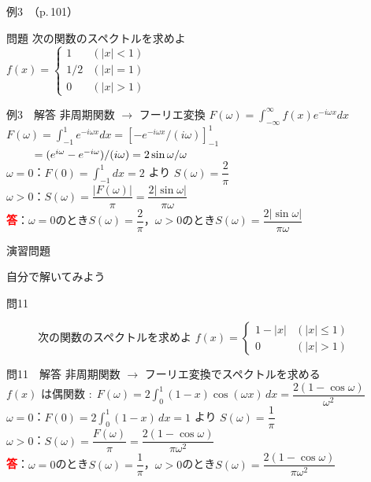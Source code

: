 \documentclass[professionalfonts]{beamer}
\begin{document}
\begin{frame}{例3　（p.\,101）}
  \begin{exampleblock}{問題}
    次の関数のスペクトルを求めよ\\[2pt]
    $f(x) = \begin{cases} 1 & (|x| < 1) \\ 1/2 & (|x| = 1) \\ 0 & (|x| > 1) \end{cases}$\\[2pt]
  \end{exampleblock}
\end{frame}

\begin{frame}{例3　解答}
  非周期関数 $\to$ フーリエ変換 $F(\omega) = \int_{-\infty}^{\infty} f(x) e^{-i\omega x} dx$\\[4pt]
  $F(\omega) = \int_{-1}^{1} e^{-i\omega x} dx = [-e^{-i\omega x}/(i\omega)]_{-1}^{1}$\\[4pt]
  $\hphantom{F(\omega)} = (e^{i\omega} - e^{-i\omega})/(i\omega) = 2\sin\omega/\omega$\\[4pt]
  $\omega=0$：$F(0)=\displaystyle\int_{-1}^{1}dx=2$ より $S(\omega)=\dfrac{2}{\pi}$\\[4pt]
  $\omega> 0$：$S(\omega) = \dfrac{|F(\omega)|}{\pi} = \dfrac{2|\sin\omega|}{\pi\omega}$
  \\[6pt]\textcolor{red}{\textbf{答}}：$\omega=0$のとき$S(\omega)=\dfrac{2}{\pi}$，$\omega>0$のとき$S(\omega)=\dfrac{2|\sin\omega|}{\pi\omega}$
\end{frame}

\begin{frame}{演習問題}
  \begin{exampleblock}{自分で解いてみよう}
  \begin{description}
    \item[問11] 次の関数のスペクトルを求めよ
    $f(x) = \begin{cases} 1-|x| & (|x| \leq 1) \\ 0 & (|x| > 1) \end{cases}$\\
  \end{description}
  \end{exampleblock}
\end{frame}

\begin{frame}{問11　解答}
  非周期関数 $\to$ フーリエ変換でスペクトルを求める\\[4pt]
  $f(x)$ は偶関数 $:\; F(\omega) = 2\displaystyle\int_{0}^1(1-x)\cos(\omega x)\,dx = \dfrac{2(1-\cos\omega)}{\omega^{2}}$\\[6pt]
  $\omega=0$：$F(0)=2\displaystyle\int_0^1(1-x)\,dx=1$ より $S(\omega)=\dfrac{1}{\pi}$\\[4pt]
  $\omega>0$：$S(\omega)=\dfrac{F(\omega)}{\pi}=\dfrac{2(1-\cos\omega)}{\pi\omega^{2}}$
  \\[6pt]\textcolor{red}{\textbf{答}}：$\omega=0$のとき$S(\omega)=\dfrac{1}{\pi}$，$\omega>0$のとき$S(\omega)=\dfrac{2(1-\cos\omega)}{\pi\omega^{2}}$
\end{frame}
\end{document}
